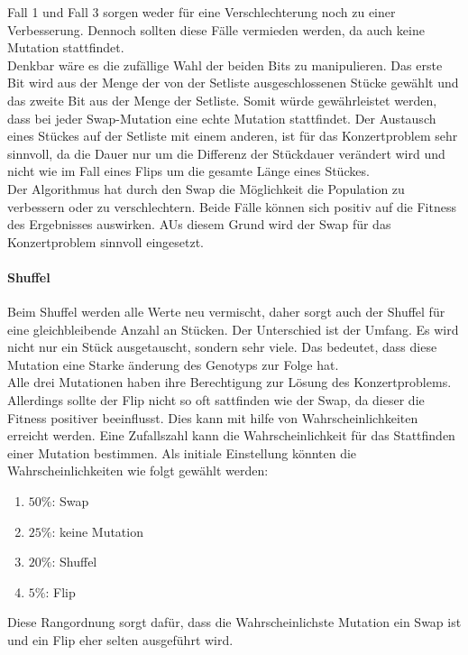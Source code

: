 Fall 1 und Fall 3 sorgen weder für eine Verschlechterung noch zu einer Verbesserung. Dennoch sollten diese 
Fälle vermieden werden, da auch keine Mutation stattfindet. \\
Denkbar wäre es die zufällige Wahl der beiden Bits zu manipulieren. Das erste Bit wird aus der Menge der 
von der Setliste ausgeschlossenen Stücke gewählt und das zweite Bit aus der Menge der Setliste. 
Somit würde gewährleistet werden, dass bei jeder Swap-Mutation eine echte Mutation stattfindet. 
Der Austausch eines Stückes auf der Setliste mit einem anderen, ist für das Konzertproblem sehr sinnvoll, 
da die Dauer nur um die Differenz der Stückdauer verändert wird und nicht wie im Fall eines Flips um die gesamte
Länge eines Stückes. \\
Der Algorithmus hat durch den Swap die Möglichkeit die Population zu verbessern oder zu verschlechtern. 
Beide Fälle können sich positiv auf die Fitness des Ergebnisses auswirken. AUs diesem Grund 
wird der Swap für das Konzertproblem sinnvoll eingesetzt. 

\paragraph{Shuffel}
Beim Shuffel werden alle Werte neu vermischt, daher sorgt auch der Shuffel für eine gleichbleibende Anzahl an Stücken.
Der Unterschied ist der Umfang. Es wird nicht nur ein Stück ausgetauscht, sondern sehr viele. 
Das bedeutet, dass diese Mutation eine Starke änderung des Genotyps zur Folge hat. \\

Alle drei Mutationen haben ihre Berechtigung zur Lösung des Konzertproblems. Allerdings sollte 
der Flip nicht so oft sattfinden wie der Swap, da dieser die Fitness positiver beeinflusst. 
Dies kann mit hilfe von Wahrscheinlichkeiten erreicht werden. Eine Zufallszahl kann die Wahrscheinlichkeit 
für das Stattfinden einer Mutation bestimmen. 
Als initiale Einstellung könnten die Wahrscheinlichkeiten wie folgt gewählt werden: 
\begin{enumerate}
    \item $50\%$: Swap
    \item $25\%$: keine Mutation
    \item $20\%$: Shuffel
    \item $5\%$: Flip
\end{enumerate}
Diese Rangordnung sorgt dafür, dass die Wahrscheinlichste Mutation ein Swap ist und ein Flip eher selten ausgeführt wird.
